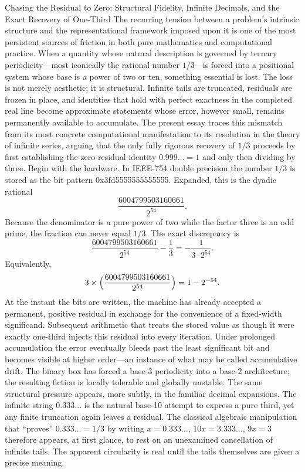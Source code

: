 Chasing the Residual to Zero: Structural Fidelity, Infinite Decimals, and the Exact Recovery of One-Third
The recurring tension between a problem’s intrinsic structure and the representational framework imposed upon it is one of the most persistent sources of friction in both pure mathematics and computational practice. When a quantity whose natural description is governed by ternary periodicity—most iconically the rational number \(1/3\)—is forced into a positional system whose base is a power of two or ten, something essential is lost. The loss is not merely aesthetic; it is structural. Infinite tails are truncated, residuals are frozen in place, and identities that hold with perfect exactness in the completed real line become approximate statements whose error, however small, remains permanently available to accumulate. The present essay traces this mismatch from its most concrete computational manifestation to its resolution in the theory of infinite series, arguing that the only fully rigorous recovery of \(1/3\) proceeds by first establishing the zero-residual identity \(0.999\ldots = 1\) and only then dividing by three.
Begin with the hardware. In IEEE-754 double precision the number \(1/3\) is stored as the bit pattern 0x3fd5555555555555. Expanded, this is the dyadic rational
\[
\frac{6004799503160661}{2^{54}}.
\]
Because the denominator is a pure power of two while the factor three is an odd prime, the fraction can never equal \(1/3\). The exact discrepancy is
\[
\frac{6004799503160661}{2^{54}} - \frac13 = -\frac1{3\cdot 2^{54}}.
\]
Equivalently,
\[
3\times\Bigl(\frac{6004799503160661}{2^{54}}\Bigr) = 1 - 2^{-54}.
\]
At the instant the bits are written, the machine has already accepted a permanent, positive residual in exchange for the convenience of a fixed-width significand. Subsequent arithmetic that treats the stored value as though it were exactly one-third injects this residual into every iteration. Under prolonged accumulation the error eventually bleeds past the least significant bit and becomes visible at higher order—an instance of what may be called accumulative drift. The binary box has forced a base-3 periodicity into a base-2 architecture; the resulting fiction is locally tolerable and globally unstable.
The same structural pressure appears, more subtly, in the familiar decimal expansions. The infinite string \(0.333\ldots\) is the natural base-10 attempt to express a pure third, yet any finite truncation again leaves a residual. The classical algebraic manipulation that “proves” \(0.333\ldots = 1/3\) by writing \(x = 0.333\ldots\), \(10x = 3.333\ldots\), \(9x = 3\) therefore appears, at first glance, to rest on an unexamined cancellation of infinite tails. The apparent circularity is real until the tails themselves are given a precise meaning.
